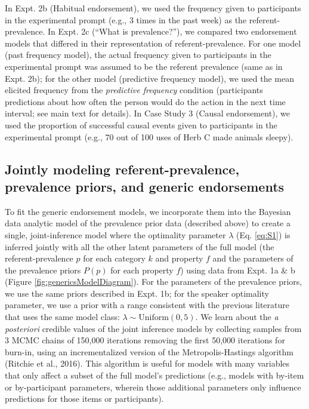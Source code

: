 \documentclass[english,,man,floatsintext]{apa6}
\theoremstyle{definition}
\theoremstyle{definition}
\theoremstyle{definition}
\theoremstyle{remark}
\begin{document}
In Expt. 2b (Habitual endorsement), we used the frequency given to
participants in the experimental prompt (e.g., 3 times in the past week)
as the referent-prevalence. In Expt. 2c (\enquote{What is prevalence?}),
we compared two endorsement models that differed in their representation
of referent-prevalence. For one model (past frequency model), the actual
frequency given to participants in the experimental prompt was assumed
to be the referent prevalence (same as in Expt. 2b); for the other model
(predictive frequency model), we used the mean elicited frequency from
the \emph{predictive frequency} condition (participants predictions
about how often the person would do the action in the next time
interval; see main text for details). In Case Study 3 (Causal
endorsement), we used the proportion of successful causal events given
to participants in the experimental prompt (e.g., 70 out of 100 uses of
Herb C made animals sleepy).

\hypertarget{jointly-modeling-referent-prevalence-prevalence-priors-and-generic-endorsements}{%
\subsection{Jointly modeling referent-prevalence, prevalence priors, and
generic
endorsements}\label{jointly-modeling-referent-prevalence-prevalence-priors-and-generic-endorsements}}

To fit the generic endorsement models, we incorporate them into the
Bayesian data analytic model of the prevalence prior data (described
above) to create a single, joint-inference model where the optimality
parameter \(\lambda\) (Eq. \ref{eq:S1}) is inferred jointly with all the
other latent parameters of the full model (the referent-prevalence \(p\)
for each category \(k\) and property \(f\) and the parameters of the
prevalence priors \(P(p)\) for each property \(f\)) using data from
Expt. 1a \& b (Figure \ref{fig:genericsModelDiagram}). For the
parameters of the prevalence priors, we use the same priors described in
Expt. 1b; for the speaker optimality parameter, we use a prior with a
range consistent with the previous literature that uses the same model
class: \(\lambda \sim \text{Uniform}(0,5)\). We learn about the
\emph{a posteriori} credible values of the joint inference models by
collecting samples from 3 MCMC chains of 150,000 iterations removing the
first 50,000 iterations for burn-in, using an incrementalized version of
the Metropolis-Hastings algorithm (Ritchie et al., 2016). This algorithm
is useful for models with many variables that only affect a subset of
the full model's predictions (e.g., models with by-item or
by-participant parameters, wherein those additional parameters only
influence predictions for those items or participants).
\end{document}
